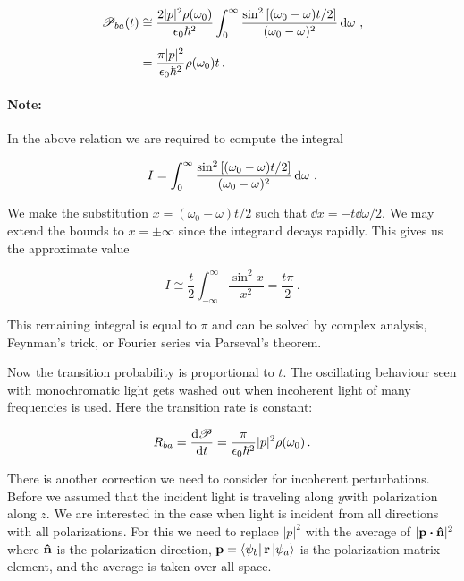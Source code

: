 \documentclass[12pt, titlepage]{article}
\begin{document}
\begin{align}
	\mathscr{P}_{ba}(t) &\cong \frac{2|p|^2\rho(\omega_0)}{\epsilon_0\hbar^2}\int_{0}^{\infty}\frac{\sin^2\qty[(\omega_0-\omega)t/2]}{(\omega_0 - \omega)^2} \dd{\omega}\,, \nonumber\\[4pt]
	&= \frac{\pi|p|^2}{\epsilon_0\hbar^2}\rho(\omega_0) t \,.
\end{align}

\begin{mdframed}
\paragraph*{Note:} In the above relation we are required to compute the integral

\begin{equation*}
	I = \int_{0}^{\infty}\frac{\sin^2\qty[(\omega_0-\omega)t/2]}{(\omega_0 - \omega)^2} \dd{\omega}\,.
\end{equation*}

We make the substitution $x = (\omega_0 - \omega)t/2$ such that $\dd{x} = -t\dd{\omega}/2$. We may extend the bounds to $x = \pm\infty$ since the integrand decays rapidly. This gives us the approximate value

\begin{equation*}
	I \cong \frac{t}{2}\int_{-\infty}^{\infty}\frac{\sin^2 x}{x^2} = \frac{t\pi}{2}\,.
\end{equation*}

This remaining integral is equal to $\pi$ and can be solved by complex analysis, Feynman's trick, or Fourier series via Parseval's theorem.
\end{mdframed}

Now the transition probability is proportional to $t$. The oscillating behaviour seen with monochromatic light gets washed out when incoherent light of many frequencies is used. Here the transition rate is constant:

\begin{equation*}
	R_{ba} = \dv{\mathscr{P}}{t} = \frac{\pi}{\epsilon_0\hbar^2}|p|^2 \rho(\omega_0) \,.
\end{equation*}

There is another correction we need to consider for incoherent perturbations. Before we assumed that the incident light is traveling along $y$with polarization along $z$. We are interested in the case when light is incident from all directions with all polarizations. For this we need to replace $|p|^2$ with the average of $|\vb{p}\vdot\vu{n}|^2$\, where $\vu{n}$ is the polarization direction, $\vb{p} = \bra{\psi_b}\vb{r}\ket{\psi_a}$ is the polarization matrix element, and the average is taken over all space.
\end{document}
